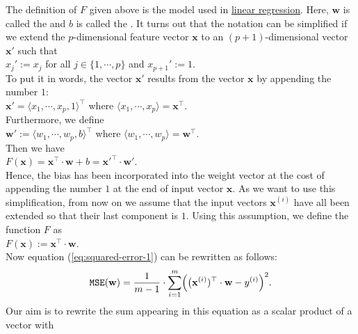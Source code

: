 The definition of $F$ given above is the model used in
\href{https://en.wikipedia.org/wiki/Linear_regression}{linear regression}. 
Here, $\mathbf{w}$ is called the  and $b$ is called the .  It turns
out that the notation can be simplified if we extend the $p$-dimensional feature vector $\mathbf{x}$ to an
$(p+1)$-dimensional vector $\mathbf{x}'$ such that
\\[0.2cm]
\hspace*{1.3cm}
$x_j' := x_j$ \quad for all $j\in\{1,\cdots,p\}$ \quad and \quad $x_{p+1}' := 1$.
\\[0.2cm]
To put it in words, the vector $\mathbf{x}'$ results from the vector $\mathbf{x}$ by appending the number $1$:
\\[0.2cm]
\hspace*{1.3cm}
$\mathbf{x}' = \langle x_1, \cdots, x_p, 1 \rangle^\top$ \quad where $\langle x_1, \cdots, x_p \rangle = \mathbf{x}^\top$.
\\[0.2cm]
Furthermore, we define 
\\[0.2cm]
\hspace*{1.3cm}
$\mathbf{w}' := \langle w_1, \cdots, w_p, b \rangle^\top$ \quad where $\langle w_1, \cdots, w_p \rangle = \mathbf{w}^\top$.
\\[0.2cm]
Then we have
\\[0.2cm]
\hspace*{1.3cm}
$F(\mathbf{x}) = \mathbf{x}^\top \cdot \mathbf{w} + b = \mathbf{x}'^\top \cdot \mathbf{w}'$.
\\[0.2cm]
Hence, the bias has been incorporated into the weight vector at the cost of appending the number $1$ at the end of
input vector $\mathbf{x}$.  As we want to use this simplification, from now on we assume that the input vectors
$\mathbf{x}^{(i)}$ have all been extended so that their last component is $1$.  Using this
assumption,  we define the
function $F$ as
\\[0.2cm]
\hspace*{1.3cm}
$F(\mathbf{x}) := \mathbf{x}^\top \cdot \mathbf{w}$.
\\[0.2cm]
Now equation (\ref{eq:squared-error-1}) can be rewritten as follows:
\begin{equation}
  \label{eq:squared-error-2}
  \mathtt{MSE}(\mathbf{w}) = \frac{1}{m-1} \cdot \sum\limits_{i=1}^m \Bigl(\bigl(\mathbf{x}^{(i)})^\top \cdot \mathbf{w}  - y^{(i)}\Bigr)^2.
\end{equation}
Our aim is to rewrite the sum appearing in this equation as a scalar product of a vector with

